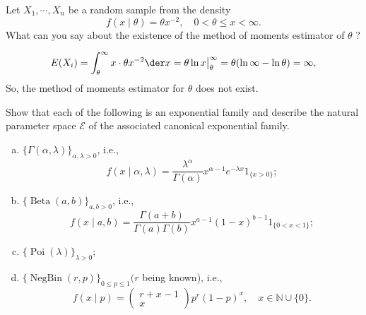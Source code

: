 \begin{ex}
	Let \(X_{1}, \cdots, X_{n}\) be a random sample from the density
	\[
	f(x \mid \theta)=\theta x^{-2}, \quad 0<\theta \leqslant x<\infty .
	\]
	What can you say about the existence of the method of moments estimator of \(\theta\) ?
\end{ex}

\begin{solution}
	\[
		E(X_i)=\int_{\theta}^\infty x\cdot \theta x^{-2}\der x=\theta \ln x \big|_\theta^\infty=\theta(\ln\infty-\ln\theta)=\infty,
	\]
	So, the method of moments estimator for \(\theta\) does not exist.
\end{solution}

\begin{ex}
	Show that each of the following is an exponential family and describe the natural parameter space \(\mathcal{E}\) of the associated canonical exponential family.
	\begin{enumerate}[(a)]
		\item \(\{\Gamma(\alpha, \lambda)\}_{\alpha, \lambda>0}\), i.e.,
		\[
		f(x \mid \alpha, \lambda)=\frac{\lambda^{\alpha}}{\Gamma(\alpha)} x^{\alpha-1} e^{-\lambda x} 1_{\{x>0\}} ;
		\]
		\item \(\{\operatorname{Beta}(a, b)\}_{a, b>0}\), i.e.,
		\[
		f(x \mid a, b)=\frac{\Gamma(a+b)}{\Gamma(a) \Gamma(b)} x^{a-1}(1-x)^{b-1} 1_{\{0<x<1\}} ;
		\]
		\item \(\{\operatorname{Poi}(\lambda)\}_{\lambda>0}\);
		\item \(\{\operatorname{NegBin}(r, p)\}_{0 \leqslant p \leqslant 1}(r\) being known), i.e.,
		\[
		f(x \mid p)=\left(\begin{array}{c}
		r+x-1 \\
		x
		\end{array}\right) p^{r}(1-p)^{x}, \quad x \in \mathbb{N} \cup\{0\} .
		\]
	\end{enumerate}
\end{ex}


